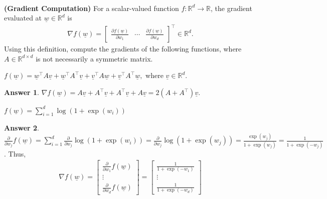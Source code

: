 \documentclass{article}
\title{\vspace{-2.5cm}\textbf{\coursefullname}\\\hatypeandnun\\\haname}
\date{}
\theoremstyle{definition}
\newtheorem*{answer}{Answer}
\begin{document}
\maketitle
\vspace*{-2cm}
\begin{question}
	\item \textbf{(Gradient Computation)} For a scalar-valued function $f : \mathbb{R}^d \to \mathbb{R}$, the gradient evaluated at $\underline{w} \in \mathbb{R}^d$ is
	\begin{align*}
		\nabla f(\underline{w}) = \begin{bmatrix}
			\frac{\partial f(\underline{w})}{\partial w_1} & \cdots & \frac{\partial f(\underline{w})}{\partial w_d}
		\end{bmatrix}^\top \in \mathbb{R}^d.
	\end{align*}
	Using this definition, compute the gradients of the following functions, where $A \in \mathbb{R}^{d \times d}$ is not necessarily a symmetric matrix.
	\begin{question}
		\item $f(\underline{w}) = \underline{w}^\top A \underline{v} + \underline{w}^\top A^\top \underline{v} + \underline{v}^\top A \underline{w} + \underline{v}^\top A^\top \underline{w},$ where $\underline{v} \in \mathbb{R}^d$.
		\begin{answer}
			$\nabla f(\underline{w}) = A \underline{v} + A^\top \underline{v} + A^\top \underline{v} + A \underline{v} = 2(A+A^\top) \underline{v}$.
		\end{answer}
		\item $f(\underline{w}) = \sum_{i=1}^d \log(1 + \exp(w_i))$
		\begin{answer}
			$\frac{\partial}{\partial w_j} f(\underline{w}) = \sum_{i=1}^d \frac{\partial}{\partial w_j} \log(1 + \exp(w_i)) = \frac{\partial}{\partial w_j} \log(1 + \exp(w_j)) = \frac{\exp(w_j)}{1 + \exp(w_j)} = \frac{1}{1 + \exp(-w_j)}$. Thus,
			\begin{align*}
				\nabla f(\underline{w}) = \begin{bmatrix}
					\frac{\partial}{\partial w_1} f(\underline{w})\\
					\vdots\\
					\frac{\partial}{\partial w_d} f(\underline{w})
				\end{bmatrix} = \begin{bmatrix}
				\frac{1}{1 + \exp(-w_1)}\\
				\vdots\\
				\frac{1}{1 + \exp(-w_d)}

\end{bmatrix}
\end{align*}
\end{answer}
\end{question}
\end{question}
\end{document}
